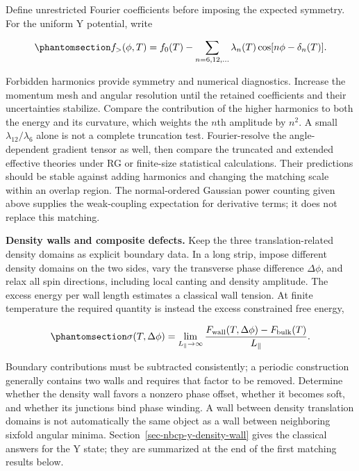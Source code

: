 Define unrestricted Fourier coefficients before imposing the expected
symmetry. For the uniform Y potential, write

\begin{equation}\phantomsection\label{eq-nbcp-matching-harmonics}{
f_>(\phi,T)=f_0(T)-\sum_{n=6,12,\ldots}
\lambda_n(T)\cos[n\phi-\delta_n(T)].
}\end{equation}

Forbidden harmonics provide symmetry and numerical diagnostics. Increase
the momentum mesh and angular resolution until the retained coefficients
and their uncertainties stabilize. Compare the contribution of the
higher harmonics to both the energy and its curvature, which weights the
\(n\)th amplitude by \(n^2\). A small \(\lambda_{12}/\lambda_6\) alone
is not a complete truncation test. Fourier-resolve the angle-dependent
gradient tensor as well, then compare the truncated and extended
effective theories under RG or finite-size statistical calculations.
Their predictions should be stable against adding harmonics and changing
the matching scale within an overlap region. The normal-ordered Gaussian
power counting given above supplies the weak-coupling expectation for
derivative terms; it does not replace this matching.

\textbf{Density walls and composite defects.} Keep the three
translation-related density domains as explicit boundary data. In a long
strip, impose different density domains on the two sides, vary the
transverse phase difference \(\Delta\phi\), and relax all spin
directions, including local canting and density amplitude. The excess
energy per wall length estimates a classical wall tension. At finite
temperature the required quantity is instead the excess constrained free
energy,

\begin{equation}\phantomsection\label{eq-nbcp-matching-wall-tension}{
\sigma(T,\Delta\phi)=\lim_{L_\parallel\to\infty}
\frac{F_{\rm wall}(T,\Delta\phi)-F_{\rm bulk}(T)}{L_\parallel}.
}\end{equation}

Boundary contributions must be subtracted consistently; a periodic
construction generally contains two walls and requires that factor to be
removed. Determine whether the density wall favors a nonzero phase
offset, whether it becomes soft, and whether its junctions bind phase
winding. A wall between density translation domains is not automatically
the same object as a wall between neighboring sixfold angular minima.
Section~\ref{sec-nbcp-y-density-wall} gives the classical answers for
the Y state; they are summarized at the end of the first matching
results below.

